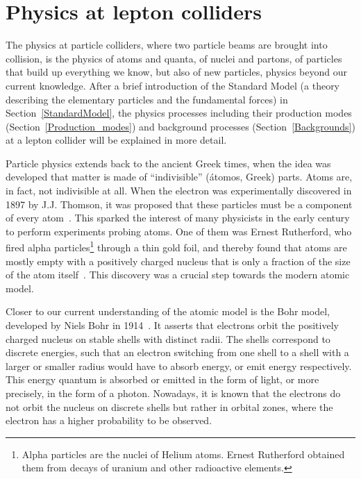 \chapter{Physics at lepton colliders}
\label{Lepton_Physics}
\begin{chapterabstract}
The physics at particle colliders, where two particle beams are brought into collision, is the physics of atoms and quanta, of nuclei and partons, of particles that build up everything we know, but also of new particles, physics beyond our current knowledge.
After a brief introduction of the Standard Model (a theory describing the elementary particles and the fundamental forces) in Section~\ref{StandardModel}, the physics processes including their production modes (Section~\ref{Production_modes}) and background processes (Section~\ref{Backgrounds}) at a lepton collider will be explained in more detail.
\end{chapterabstract}
\vspace*{0.5cm}\newline 
\noindent
Particle physics extends back to the ancient Greek times, when the idea was developed that matter is made of ``indivisible'' (\'atomos, Greek) parts.
Atoms are, in fact, not indivisible at all.
When the electron was experimentally discovered in 1897 by J.J. Thomson, it was proposed that these particles must be a component of every atom~\cite[p. 13ff]{Griffiths}.
This sparked the interest of many physicists in the early  century to perform experiments probing atoms.
One of them was Ernest Rutherford, who fired alpha particles\footnote{Alpha particles are the nuclei of Helium atoms. Ernest Rutherford obtained them from decays of uranium and other radioactive elements.} through a thin gold foil, and thereby found that atoms are mostly empty with a positively charged nucleus that is only a fraction of the size of the atom itself~\cite{GoldFoil}.
This discovery was a crucial step towards the modern atomic model.

Closer to our current understanding of the atomic model is the Bohr model, developed by Niels Bohr in 1914~\cite[p. 15]{Griffiths}.
It asserts that electrons orbit the positively charged nucleus on stable shells with distinct radii.
The shells correspond to discrete energies, such that an electron switching from one shell to a shell with a larger or smaller radius would have to absorb energy, or emit energy respectively.
This energy quantum is absorbed or emitted in the form of light, or more precisely, in the form of a photon.
Nowadays, it is known that the electrons do not orbit the nucleus on discrete shells but rather in orbital zones, where the electron has a higher probability to be observed.


